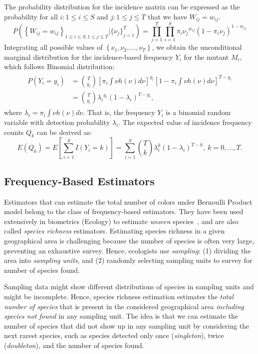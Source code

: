 \documentclass[sigconf]{acmart}
\begin{document}
The probability distribution for the incidence matrix can be expressed as the
probability for all $i:1\leq i \leq S $ and $j:1\leq j\leq T$ that we have $W_{ij} = w_{ij}$.
\small
\begin{displaymath}
    P\left(\left\{W_{ij}=w_{ij}\right\}_{1\leq i\leq S,1\leq j\leq T}|\{\nu_{j}\}_{j=1}^T \right)= \prod_{j=1}^{T}\prod_{i=1}^{S} {\pi_i \nu_j}^{w_{ij}} (1-{\pi_i \nu_j})^{1-w_{ij}}
\end{displaymath}
\normalsize
Integrating all possible values of $\left\{\nu_1, \nu_2,\dots,\nu_T \right\}$, we obtain the unconditional marginal distribution for the incidence-based frequency $Y_i$ for the mutant $M_i$,
which follows Binomial distribution:
\begin{gather*}
    \begin{split}
        P(Y_i=y_i)&={T \choose y_i}\left[\pi_i\int \nu h(\nu) d\nu\right]^{y_i} \left[1-\pi_i\int \nu h(\nu) d\nu \right]^{T-y_i} \\
        &={T \choose y_i}{\lambda_i}^{y_i} (1-{\lambda_i})^{T-y_i},
    \end{split}
\end{gather*}
where  $\lambda_i=\pi_i \int \nu h(\nu)d\nu$.
That is, the frequency $Y_i$ is a binomial random variable with detection probability $\lambda_i$.
The expected value of incidence frequency counts $Q_k$ can be derived as:
\[
    E(Q_k)=E\left[ \sum_{i=1}^{S}I(Y_i=k)  \right]=\sum_{i=1}^{S}{T \choose k}\lambda_{i}^k(1-\lambda_{i})^{T-k}, ~k=0,\dots,T.
\]

\subsection{Frequency-Based Estimators}
\label{sec:estimators}
Estimators that can estimate the total number of colors under Bernoulli Product model belong to the class of frequency-based estimators.
They have been used extensively in biometrics (Ecology)
to estimate \emph{unseen} species~\cite{chao2016species}, and are also called \emph{species richness} estimators.
Estimating species richness in a given geographical area is challenging
because the number of species is often very large,
preventing an exhaustive survey.
Hence, ecologists use \emph{sampling}:
(1) dividing the area into \emph{sampling units}, and %
(2) randomly selecting sampling units to survey for number of species found.

Sampling data might show different distributions of species in sampling units
and might be incomplete.
Hence, %
species richness estimation %
estimates the \emph{total number of species} that is present
in the considered geographical area \emph{including species not found} in
any sampling unit.
The idea is that we can estimate the number
of species that did not show up in any sampling unit 
by considering the next rarest species, such as species
detected only once (\emph{singleton}), twice (\emph{doubleton}),
and the number of species found.
\end{document}
